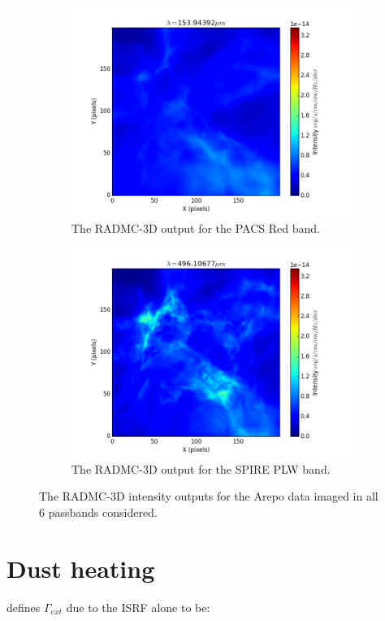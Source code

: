 \documentclass{report}
\begin{document}
\begin{figure}[H]
\begin{subfigure}[b]{.45\linewidth}
\includegraphics[width=\linewidth]{../img/sph/red.png}
\caption{The RADMC-3D output for the PACS Red band.}\label{fig:sphred}
\end{subfigure}
\begin{subfigure}[b]{.45\linewidth}
\includegraphics[width=\linewidth]{../img/sph/plw.png}
\caption{The RADMC-3D output for the SPIRE PLW band.}\label{fig:sphplw}
\end{subfigure}
\caption{The RADMC-3D intensity outputs for the Arepo data imaged in all 6 passbands considered.} \label{fig:sph-output}
\end{figure}

\section{Dust heating}
\textcite{treecol} defines $\Gamma_{ext}$ due to the ISRF alone to be:
\end{document}
